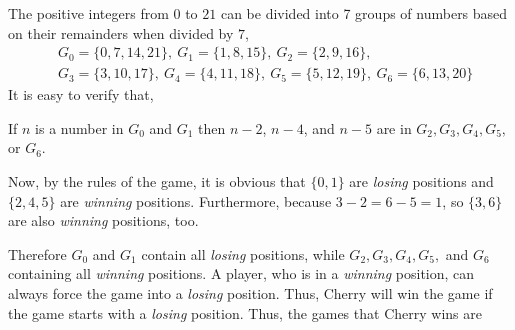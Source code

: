 \documentclass{article}
\begin{document}
\begin{soln}
    The positive integers from $0$ to $21$ can be divided into 7 groups of numbers based on their remainders when divided by $7$,
    \[
        \begin{aligned}
            &G_0=\{0,7,14,21\},\ G_1=\{1,8,15\},\ G_2=\{2,9,16\},\\
            &G_3=\{3,10,17\},\ G_4=\{4,11,18\},\ G_5=\{5,12,19\},\ G_6=\{6,13,20\}
        \end{aligned}
    \]
    It is easy to verify that,
    \begin{claim*}
        If $n$ is a number in $G_0$ and $G_1$ then $n-2$, $n-4$, and $n-5$ are in $G_2,G_3,G_4,G_5,$ or $G_6$.
    \end{claim*}
    Now, by the rules of the game, it is obvious that $\{0, 1\}$ are \textit{losing} positions and $\{2,4,5\}$ are \textit{winning} positions.
    Furthermore, because $3-2=6-5=1$, so $\{3,6\}$ are also \textit{winning} positions, too.
    
    Therefore $G_0$ and $G_1$ contain all \textit{losing} positions, while $G_2,G_3,G_4,G_5,$ and $G_6$ containing all \textit{winning} positions.
    A player, who is in a \textit{winning} position, can always force the game into a \textit{losing} position.
    Thus, Cherry will win the game if the game starts with a \textit{losing} position.
    Thus, the games that Cherry wins are 
\end{soln}
\end{document}
